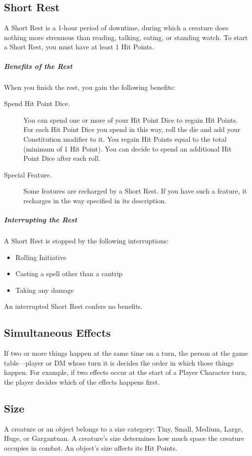 \documentclass[10pt,a4paper,twoside,bg=print,twocolumn,openany,nodeprecatedcode]{dndarticle}
\begin{document}
\subsection{Short Rest}
A Short Rest is a 1-hour period of downtime, during which a creature does nothing more strenuous than reading, talking, eating, or standing watch. To start a Short Rest, you must have at least 1 Hit Points.

\subparagraph{Benefits of the Rest}
When you finish the rest, you gain the following benefits:


\begin{description}
\item[Spend Hit Point Dice.]
You can spend one or more of your Hit Point Dice to regain Hit Points. For each Hit Point Dice you spend in this way, roll the die and add your Constitution modifier to it. You regain Hit Points equal to the total (minimum of 1 Hit Point). You can decide to spend an additional Hit Point Dice after each roll.

\item[Special Feature.]
Some features are recharged by a Short Rest. If you have such a feature, it recharges in the way specified in its description.

\end{description}

\subparagraph{Interrupting the Rest}
A Short Rest is stopped by the following interruptions:


\begin{itemize}
\item Rolling Initiative
\item Casting a spell other than a cantrip
\item Taking any damage
\end{itemize}

An interrupted Short Rest confers no benefits.

\subsection{Simultaneous Effects}
If two or more things happen at the same time on a turn, the person at the game table—player or DM whose turn it is decides the order in which those things happen. For example, if two effects occur at the start of a Player Character turn, the player decides which of the effects happens first.

\subsection{Size}
A creature or an object belongs to a size category: Tiny, Small, Medium, Large, Huge, or Gargantuan. A creature's size determines how much space the creature occupies in combat. An object's size affects its Hit Points.
\end{document}
